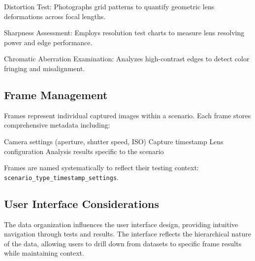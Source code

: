 Distortion Test: Photographs grid patterns to quantify geometric lens deformations across focal lengths.

Sharpness Assessment: Employs resolution test charts to measure lens resolving power and edge performance.

Chromatic Aberration Examination: Analyzes high-contrast edges to detect color fringing and misalignment.

\subsection{Frame Management}
Frames represent individual captured images within a scenario. Each frame stores comprehensive metadata including:

Camera settings (aperture, shutter speed, ISO)
Capture timestamp
Lens configuration
Analysis results specific to the scenario

Frames are named systematically to reflect their testing context: \texttt{scenario\_type\_timestamp\_settings}.

\subsection{User Interface Considerations}
The data organization influences the user interface design, providing intuitive navigation through tests and results. The interface reflects the hierarchical nature of the data, allowing users to drill down from datasets to specific frame results while maintaining context.